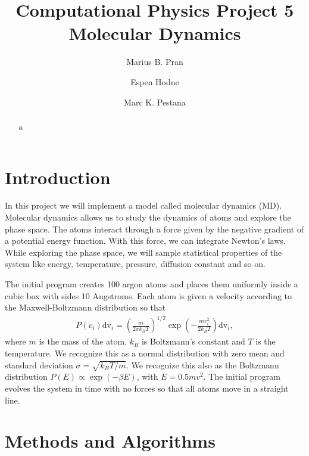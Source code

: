 \documentclass[10pt,showpacs,preprintnumbers,footinbib,amsmath,amssymb,aps,prl,twocolumn,groupedaddress,superscriptaddress,showkeys]{revtex4-1}
\renewcommand{\d}{\mathrm d}
\begin{document}
\title[CPP2]{Computational Physics Project 5\\
\large{Molecular Dynamics}}

\author{Marius B. Pran}
\author{Espen Hodne} 
\author{Marc K. Pestana}


\begin{abstract}
a
\end{abstract}


\maketitle



\section{Introduction}
In this project we will implement a model called molecular dynamics (MD). Molecular dynamics allows us to study the dynamics of atoms and explore the phase space. The atoms interact through a force given by the negative gradient of a potential energy function. With this force, we can integrate Newton's laws. While exploring the phase space, we will sample statistical properties of the system like energy, temperature, pressure, diffusion constant and so on.

The initial program creates 100 argon atoms
and places them uniformly inside a cubic box with sides 10
Angstroms. Each atom is given a velocity according to the
Maxwell-Boltzmann distribution so that
\begin{align} 
P(v_i)\d\mathrm{v}_i = \left(\frac{m}{2\pi k_B
T}\right)^{1/2} \exp\left(-\frac{m v_i^2}{2k_B T}\right)\d\mathrm{v}_i,
\end{align} 
where $m$ is the mass of the atom, $k_B$ is
Boltzmann's constant and $T$ is the temperature. We recognize this as
a normal distribution with zero mean and standard deviation $\sigma =
\sqrt{k_B T/m}$. We recognize this also as the Boltzmann distribution $P(E) \propto \exp{(-\beta E)}$, with $E = 0.5mv^2$.
The initial program evolves the system in time with no
forces so that all atoms move in a straight line.

\section{Methods and Algorithms}
\end{document}
